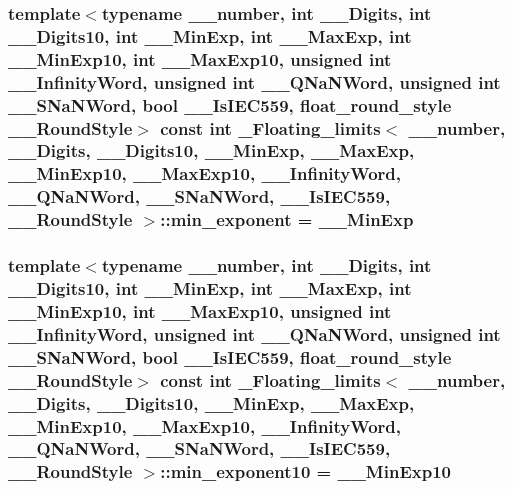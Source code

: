 \subsubsection[{min\+\_\+exponent}]{\setlength{\rightskip}{0pt plus 5cm}template$<$typename \+\_\+\+\_\+number, int \+\_\+\+\_\+\+Digits, int \+\_\+\+\_\+\+Digits10, int \+\_\+\+\_\+\+Min\+Exp, int \+\_\+\+\_\+\+Max\+Exp, int \+\_\+\+\_\+\+Min\+Exp10, int \+\_\+\+\_\+\+Max\+Exp10, unsigned int \+\_\+\+\_\+\+Infinity\+Word, unsigned int \+\_\+\+\_\+\+Q\+Na\+N\+Word, unsigned int \+\_\+\+\_\+\+S\+Na\+N\+Word, bool \+\_\+\+\_\+\+Is\+I\+E\+C559, float\+\_\+round\+\_\+style \+\_\+\+\_\+\+Round\+Style$>$ const int {\bf \+\_\+\+Floating\+\_\+limits}$<$ \+\_\+\+\_\+number, \+\_\+\+\_\+\+Digits, \+\_\+\+\_\+\+Digits10, \+\_\+\+\_\+\+Min\+Exp, \+\_\+\+\_\+\+Max\+Exp, \+\_\+\+\_\+\+Min\+Exp10, \+\_\+\+\_\+\+Max\+Exp10, \+\_\+\+\_\+\+Infinity\+Word, \+\_\+\+\_\+\+Q\+Na\+N\+Word, \+\_\+\+\_\+\+S\+Na\+N\+Word, \+\_\+\+\_\+\+Is\+I\+E\+C559, \+\_\+\+\_\+\+Round\+Style $>$\+::min\+\_\+exponent = \+\_\+\+\_\+\+Min\+Exp\hspace{0.3cm}{\ttfamily [static]}}\label{class__Floating__limits_a5814f067642ab3448ece1a803e571a6d}
\hypertarget{class__Floating__limits_a47c916c33db0a7a4bc1d717994648052}{}
\subsubsection[{min\+\_\+exponent10}]{\setlength{\rightskip}{0pt plus 5cm}template$<$typename \+\_\+\+\_\+number, int \+\_\+\+\_\+\+Digits, int \+\_\+\+\_\+\+Digits10, int \+\_\+\+\_\+\+Min\+Exp, int \+\_\+\+\_\+\+Max\+Exp, int \+\_\+\+\_\+\+Min\+Exp10, int \+\_\+\+\_\+\+Max\+Exp10, unsigned int \+\_\+\+\_\+\+Infinity\+Word, unsigned int \+\_\+\+\_\+\+Q\+Na\+N\+Word, unsigned int \+\_\+\+\_\+\+S\+Na\+N\+Word, bool \+\_\+\+\_\+\+Is\+I\+E\+C559, float\+\_\+round\+\_\+style \+\_\+\+\_\+\+Round\+Style$>$ const int {\bf \+\_\+\+Floating\+\_\+limits}$<$ \+\_\+\+\_\+number, \+\_\+\+\_\+\+Digits, \+\_\+\+\_\+\+Digits10, \+\_\+\+\_\+\+Min\+Exp, \+\_\+\+\_\+\+Max\+Exp, \+\_\+\+\_\+\+Min\+Exp10, \+\_\+\+\_\+\+Max\+Exp10, \+\_\+\+\_\+\+Infinity\+Word, \+\_\+\+\_\+\+Q\+Na\+N\+Word, \+\_\+\+\_\+\+S\+Na\+N\+Word, \+\_\+\+\_\+\+Is\+I\+E\+C559, \+\_\+\+\_\+\+Round\+Style $>$\+::min\+\_\+exponent10 = \+\_\+\+\_\+\+Min\+Exp10\hspace{0.3cm}{\ttfamily [static]}}\label{class__Floating__limits_a47c916c33db0a7a4bc1d717994648052}
\hypertarget{class__Floating__limits_aeca7d9a740d59373c6144cf1038af06f}{}
